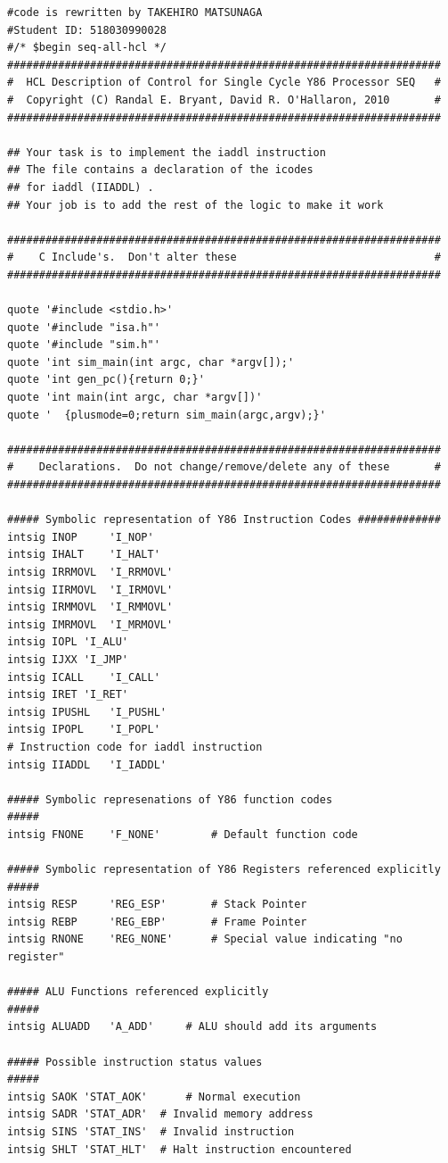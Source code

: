 \documentclass{article}
\begin{document}
\begin{lstlisting}[numberstyle=\scriptsize, basicstyle=\scriptsize]
#code is rewritten by TAKEHIRO MATSUNAGA
#Student ID: 518030990028
#/* $begin seq-all-hcl */
####################################################################
#  HCL Description of Control for Single Cycle Y86 Processor SEQ   #
#  Copyright (C) Randal E. Bryant, David R. O'Hallaron, 2010       #
####################################################################

## Your task is to implement the iaddl instruction
## The file contains a declaration of the icodes
## for iaddl (IIADDL) .
## Your job is to add the rest of the logic to make it work

####################################################################
#    C Include's.  Don't alter these                               #
####################################################################

quote '#include <stdio.h>'
quote '#include "isa.h"'
quote '#include "sim.h"'
quote 'int sim_main(int argc, char *argv[]);'
quote 'int gen_pc(){return 0;}'
quote 'int main(int argc, char *argv[])'
quote '  {plusmode=0;return sim_main(argc,argv);}'

####################################################################
#    Declarations.  Do not change/remove/delete any of these       #
####################################################################

##### Symbolic representation of Y86 Instruction Codes #############
intsig INOP 	'I_NOP'
intsig IHALT	'I_HALT'
intsig IRRMOVL	'I_RRMOVL'
intsig IIRMOVL	'I_IRMOVL'
intsig IRMMOVL	'I_RMMOVL'
intsig IMRMOVL	'I_MRMOVL'
intsig IOPL	'I_ALU'
intsig IJXX	'I_JMP'
intsig ICALL	'I_CALL'
intsig IRET	'I_RET'
intsig IPUSHL	'I_PUSHL'
intsig IPOPL	'I_POPL'
# Instruction code for iaddl instruction
intsig IIADDL	'I_IADDL'

##### Symbolic represenations of Y86 function codes                  #####
intsig FNONE    'F_NONE'        # Default function code

##### Symbolic representation of Y86 Registers referenced explicitly #####
intsig RESP     'REG_ESP'    	# Stack Pointer
intsig REBP     'REG_EBP'    	# Frame Pointer
intsig RNONE    'REG_NONE'   	# Special value indicating "no register"

##### ALU Functions referenced explicitly                            #####
intsig ALUADD	'A_ADD'		# ALU should add its arguments

##### Possible instruction status values                             #####
intsig SAOK	'STAT_AOK'		# Normal execution
intsig SADR	'STAT_ADR'	# Invalid memory address
intsig SINS	'STAT_INS'	# Invalid instruction
intsig SHLT	'STAT_HLT'	# Halt instruction encountered


\end{lstlisting}
\end{document}
